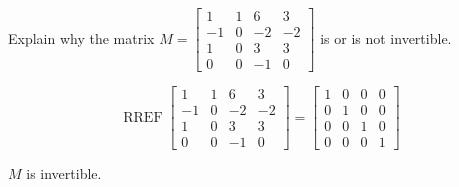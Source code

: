 
\begin{exerciseStatement}


Explain why the matrix \(M= \left[\begin{array}{cccc}
1 & 1 & 6 & 3 \\
-1 & 0 & -2 & -2 \\
1 & 0 & 3 & 3 \\
0 & 0 & -1 & 0
\end{array}\right] \) is or is not invertible.


\end{exerciseStatement}
    
\begin{exerciseAnswer} 


\[\operatorname{RREF} \left[\begin{array}{cccc}
1 & 1 & 6 & 3 \\
-1 & 0 & -2 & -2 \\
1 & 0 & 3 & 3 \\
0 & 0 & -1 & 0
\end{array}\right] = \left[\begin{array}{cccc}
1 & 0 & 0 & 0 \\
0 & 1 & 0 & 0 \\
0 & 0 & 1 & 0 \\
0 & 0 & 0 & 1
\end{array}\right] \]

\(M\) is invertible.
\end{exerciseAnswer}
    
